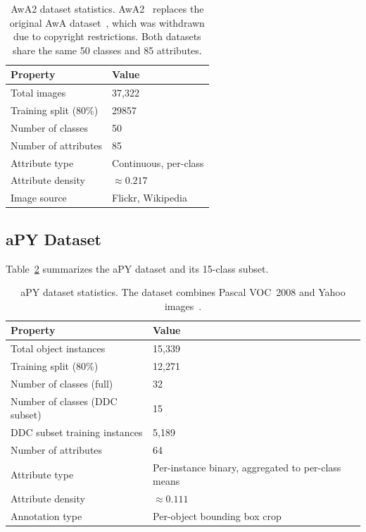 \begin{table}[H]
\centering
\caption{AwA2 dataset statistics. AwA2~\citep{Xian2018} replaces the original AwA dataset~\citep{Lampert2013}, which was withdrawn due to copyright restrictions. Both datasets share the same 50 classes and 85 attributes.}
\label{tab:awa2_stats}
\begin{tabular}{ll}
\toprule
\textbf{Property} & \textbf{Value} \\
\midrule
Total images & 37,322 \\
Training split (80\%) & 29857 \\
Number of classes & 50 \\
Number of attributes & 85 \\
Attribute type & Continuous, per-class \\
Attribute density & $\approx 0.217$ \\
Image source & Flickr, Wikipedia \\
\bottomrule
\end{tabular}
\end{table}

\subsection{aPY Dataset}

Table~\ref{tab:apy_stats} summarizes the aPY dataset and its 15-class subset.

\begin{table}[H]
\centering
\caption{aPY dataset statistics. The dataset combines Pascal VOC~2008 and Yahoo images~\citep{Farhadi2009}.}
\label{tab:apy_stats}
\begin{tabular}{ll}
\toprule
\textbf{Property} & \textbf{Value} \\
\midrule
Total object instances & 15,339 \\
Training split (80\%) & 12,271 \\
Number of classes (full) & 32 \\
Number of classes (DDC subset) & 15 \\
DDC subset training instances & 5,189 \\
Number of attributes & 64 \\
Attribute type & Per-instance binary, aggregated to per-class means \\
Attribute density & $\approx 0.111$ \\
Annotation type & Per-object bounding box crop \\
\bottomrule
\end{tabular}
\end{table}

